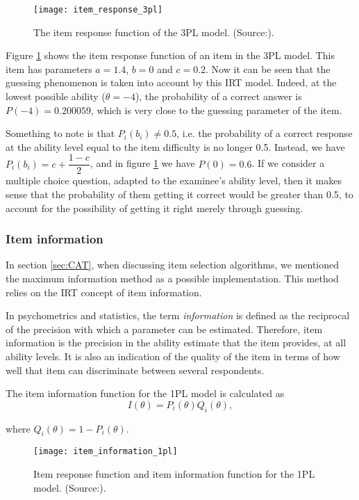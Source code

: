 \begin{figure}[H]
\centering
\texttt{[image: item\_response\_3pl]}
\caption{The item response function of the 3PL model. (Source:\cite{Visual-IRT}).}
\label{fig:item_response_3pl}
\end{figure}

Figure \ref{fig:item_response_3pl} shows the item response function of an item in the 3PL model. This item has parameters $a=1.4$, $b=0$ and $c=0.2$. Now it can be seen that the guessing phenomenon is taken into account by this IRT model. Indeed, at the lowest possible ability ($\theta=-4$), the probability of a correct answer is $P(-4)=0.200059$, which is very close to the guessing parameter of the item.\newline

Something to note is that $P_i(b_i) \neq 0.5$, i.e. the probability of a correct response at the ability level equal to the item difficulty is no longer 0.5. Instead, we have $P_i(b_i)= c + \dfrac{1-c}{2}$, and in figure \ref{fig:item_response_3pl} we have $P(0)=0.6$. If we consider a multiple choice question, adapted to the examinee's ability level, then it makes sense that the probability of them getting it correct would be greater than 0.5, to account for the possibility of getting it right merely through guessing.

\subsubsection{Item information}
In section \ref{sec:CAT}, when discussing item selection algorithms, we mentioned the maximum information method as a possible implementation. This method relies on the IRT concept of item information.\newline

In psychometrics and statistics, the term \textit{information} is defined as the reciprocal of the precision with which a parameter can be estimated\cite{Basics-IRT}. Therefore, item information is the precision in the ability estimate that the item provides, at all ability levels. It is also an indication of the quality of the item in terms of how well that item can discriminate between several respondents. \newline

The item information function for the 1PL model is calculated as
$$I(\theta) = P_i(\theta)Q_i(\theta),$$

where $Q_i(\theta) = 1-P_i(\theta)$.

\begin{figure}[H]
\centering
\texttt{[image: item\_information\_1pl]}
\caption{Item response function and item information
function for the 1PL model. (Source:\cite{Visual-IRT}).}
\label{fig:item_information_1pl}
\end{figure}


